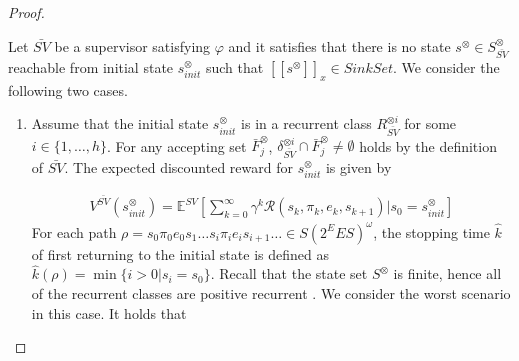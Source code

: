 \documentclass[10pt]{article}
\theoremstyle{definition}
\newcommand{\myspq}{\ensuremath{[\![s^{\otimes}]\!]}_x}
\begin{document}
\begin{proof}
\begin{enumerate}
\end{enumerate}
  Let $\bar{SV}$ be a supervisor satisfying $\varphi$ and it satisfies that there is no state $s^{\otimes} \in S^{\otimes}_{\bar{SV}}$ reachable from initial state $s^{\otimes}_{init}$ such that $\myspq \in SinkSet$. We consider the following two cases.

  \begin{enumerate}
    \vspace{2mm}
    \item Assume that the initial state $s^{\otimes}_{init}$ is in a recurrent class $R^{\otimes i}_{\bar{SV}}$ for some $ i \in \{ 1,\ldots,h \} $.
    For any accepting set $\bar{F}^{\otimes}_j$, $\delta^{\otimes i}_{\bar{SV}} \cap \bar{F}^{\otimes}_j \neq \emptyset$ holds by the definition of $\bar{SV}$. The expected discounted reward for $s^{\otimes}_{init}$ is given by

  \begin{align}
    V^{\bar{SV}}(s^{\otimes}_{init}) = \mathbb{E}^{SV}[ {\sum_{k=0}^{\infty}} \gamma^k \mathcal{R}(s_k, \pi_k, e_k, s_{k+1}) | s_0 = s^{\otimes}_{init} ]
  \end{align}
    For each path $\rho = s_0 \pi_0 e_0 s_1 \ldots s_i \pi_i e_i s_{i+1} \ldots \in S (2^E E S)^{\omega}$, the stopping time $\hat{k}$ of first returning to the initial state is defined as $\hat{k}(\rho) = \min \{ i > 0 | s_i = s_0 \}$. Recall that the state set $S^{\otimes}$ is finite, hence all of the recurrent classes are positive recurrent \cite{ISP}. We consider the worst scenario in this case. It holds that


\end{enumerate}
\end{proof}
\end{document}
